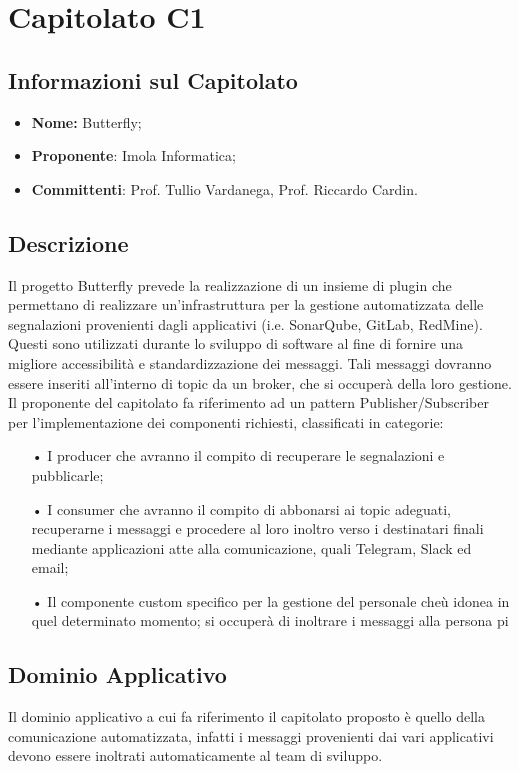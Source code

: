 \section{Capitolato C1}
\subsection{Informazioni sul Capitolato}
\begin{itemize}
	\item \textbf{Nome:} Butterfly;
	\item \textbf{Proponente}: Imola Informatica;
	\item \textbf{Committenti}: Prof. Tullio Vardanega, Prof. Riccardo Cardin.
\end{itemize}

\subsection{Descrizione}
Il progetto Butterfly prevede la realizzazione di un insieme di plugin che permettano di realizzare un'infrastruttura per la gestione automatizzata delle segnalazioni provenienti dagli applicativi (i.e. SonarQube, GitLab, RedMine). Questi sono utilizzati durante lo sviluppo di software al fine di fornire una migliore accessibilità e standardizzazione dei messaggi. Tali messaggi dovranno essere inseriti all'interno di topic da un broker, che si occuperà della loro gestione. Il proponente del capitolato fa riferimento ad un pattern Publisher/Subscriber per l'implementazione dei componenti richiesti, classificati in categorie:
\begin{itemize}
\item[•]I producer che avranno il compito di recuperare le segnalazioni e pubblicarle;
\item[•] I consumer che avranno il compito di abbonarsi ai topic adeguati, recuperarne i messaggi e procedere al loro inoltro verso i destinatari finali mediante applicazioni atte alla comunicazione, quali Telegram, Slack ed email;
\item[•]Il componente custom specifico per la gestione del personale cheù idonea in quel determinato momento; si occuperà di inoltrare i messaggi alla persona pi
\end{itemize}
\subsection{Dominio Applicativo}
Il dominio applicativo a cui fa riferimento il capitolato proposto è quello della comunicazione automatizzata, infatti i messaggi provenienti dai vari applicativi devono essere inoltrati automaticamente al team di sviluppo.
